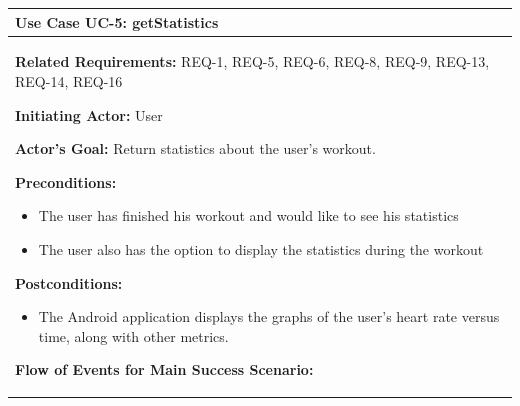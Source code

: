 \documentclass[letterpaper,english, 12pt]{scrreprt}
\begin{document}
\begin{center}
        \begin{tabular}{|C{15cm}|}
                \hline
                        \textbf{Use Case UC-5: getStatistics}\\
                \hline
                        \begin{flushleft}
                                \textbf{Related Requirements: } REQ-1, REQ-5, REQ-6, REQ-8, REQ-9, REQ-13, REQ-14, REQ-16
                        \end{flushleft}
                        \begin{flushleft}
                                \textbf{Initiating Actor: } User
                        \end{flushleft}
                        \begin{flushleft}
                                \textbf{Actor's Goal: } Return statistics about the user's workout.
                        \end{flushleft}
                        \begin{flushleft}
                                \textbf{Preconditions: }
                        \end{flushleft}
                                \begin{itemize}
                                        \item The user has finished his workout and would like to see his statistics
                                        \item The user also has the option to display the statistics during the workout
                                \end{itemize}
                        \begin{flushleft}
                                \textbf{Postconditions: }
                        \end{flushleft}
                                \begin{itemize}
                                        \item The Android application displays the graphs of the user's heart rate versus time, along with other metrics.
                                \end{itemize}
                        \begin{flushleft}
                                \textbf{Flow of Events for Main Success Scenario: }
                        \end{flushleft}
                                \begin{itemize}

\end{itemize}
\end{tabular}
\end{center}
\end{document}

